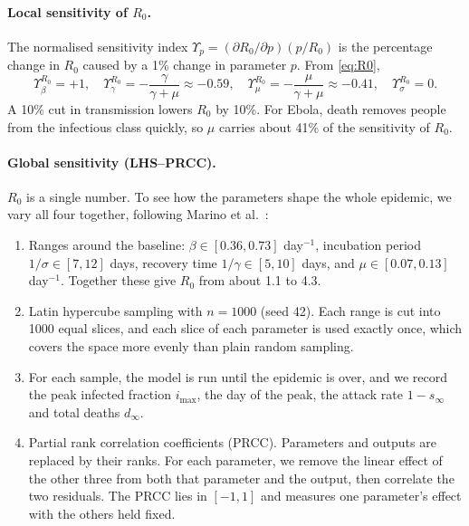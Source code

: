 \documentclass[11pt,a4paper]{article}
\begin{document}
\paragraph{Local sensitivity of $R_0$.} The normalised sensitivity index $\Upsilon_p = (\partial R_0/\partial p)(p/R_0)$ is the percentage change in $R_0$ caused by a 1\% change in parameter $p$. From \eqref{eq:R0},
\begin{equation}
    \Upsilon_\beta^{R_0} = +1, \quad
    \Upsilon_\gamma^{R_0} = -\frac{\gamma}{\gamma + \mu} \approx -0.59, \quad
    \Upsilon_\mu^{R_0} = -\frac{\mu}{\gamma + \mu} \approx -0.41, \quad
    \Upsilon_\sigma^{R_0} = 0.
\end{equation}
A 10\% cut in transmission lowers $R_0$ by 10\%. For Ebola, death removes people from the infectious class quickly, so $\mu$ carries about 41\% of the sensitivity of $R_0$.

\paragraph{Global sensitivity (LHS--PRCC).} $R_0$ is a single number. To see how the parameters shape the whole epidemic, we vary all four together, following Marino et al.~\cite{marino2008methodology}:
\begin{enumerate}
    \item Ranges around the baseline: $\beta \in [0.36, 0.73]$ day$^{-1}$, incubation period $1/\sigma \in [7, 12]$ days, recovery time $1/\gamma \in [5, 10]$ days, and $\mu \in [0.07, 0.13]$ day$^{-1}$. Together these give $R_0$ from about 1.1 to 4.3.
    \item Latin hypercube sampling with $n = 1000$ (seed 42). Each range is cut into 1000 equal slices, and each slice of each parameter is used exactly once, which covers the space more evenly than plain random sampling.
    \item For each sample, the model is run until the epidemic is over, and we record the peak infected fraction $i_{\max}$, the day of the peak, the attack rate $1 - s_\infty$ and total deaths $d_\infty$.
    \item Partial rank correlation coefficients (PRCC). Parameters and outputs are replaced by their ranks. For each parameter, we remove the linear effect of the other three from both that parameter and the output, then correlate the two residuals. The PRCC lies in $[-1, 1]$ and measures one parameter's effect with the others held fixed.
\end{enumerate}
\end{document}
